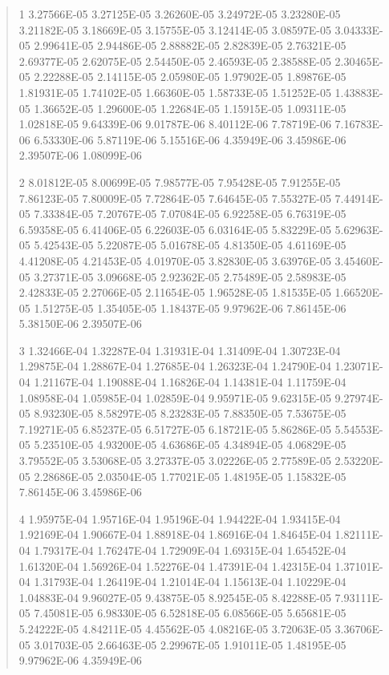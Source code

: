 \documentclass[letterpaper,10pt,english]{sphinxmanual}
\begin{document}
\begin{quote}
\begin{DUlineblock}{0em}
\item[]
\begin{DUlineblock}{\DUlineblockindent}
\item[] 1   3.27566E-05  3.27125E-05  3.26260E-05  3.24972E-05  3.23280E-05  3.21182E-05  3.18669E-05  3.15755E-05  3.12414E-05  3.08597E-05  3.04333E-05  2.99641E-05  2.94486E-05  2.88882E-05  2.82839E-05  2.76321E-05  2.69377E-05  2.62075E-05  2.54450E-05  2.46593E-05  2.38588E-05  2.30465E-05  2.22288E-05  2.14115E-05  2.05980E-05  1.97902E-05  1.89876E-05  1.81931E-05  1.74102E-05  1.66360E-05  1.58733E-05  1.51252E-05  1.43883E-05  1.36652E-05  1.29600E-05  1.22684E-05  1.15915E-05  1.09311E-05  1.02818E-05  9.64339E-06  9.01787E-06  8.40112E-06  7.78719E-06  7.16783E-06  6.53330E-06  5.87119E-06  5.15516E-06  4.35949E-06  3.45986E-06  2.39507E-06  1.08099E-06
\item[] 2   8.01812E-05  8.00699E-05  7.98577E-05  7.95428E-05  7.91255E-05  7.86123E-05  7.80009E-05  7.72864E-05  7.64645E-05  7.55327E-05  7.44914E-05  7.33384E-05  7.20767E-05  7.07084E-05  6.92258E-05  6.76319E-05  6.59358E-05  6.41406E-05  6.22603E-05  6.03164E-05  5.83229E-05  5.62963E-05  5.42543E-05  5.22087E-05  5.01678E-05  4.81350E-05  4.61169E-05  4.41208E-05  4.21453E-05  4.01970E-05  3.82830E-05  3.63976E-05  3.45460E-05  3.27371E-05  3.09668E-05  2.92362E-05  2.75489E-05  2.58983E-05  2.42833E-05  2.27066E-05  2.11654E-05  1.96528E-05  1.81535E-05  1.66520E-05  1.51275E-05  1.35405E-05  1.18437E-05  9.97962E-06  7.86145E-06  5.38150E-06  2.39507E-06
\item[] 3   1.32466E-04  1.32287E-04  1.31931E-04  1.31409E-04  1.30723E-04  1.29875E-04  1.28867E-04  1.27685E-04  1.26323E-04  1.24790E-04  1.23071E-04  1.21167E-04  1.19088E-04  1.16826E-04  1.14381E-04  1.11759E-04  1.08958E-04  1.05985E-04  1.02859E-04  9.95971E-05  9.62315E-05  9.27974E-05  8.93230E-05  8.58297E-05  8.23283E-05  7.88350E-05  7.53675E-05  7.19271E-05  6.85237E-05  6.51727E-05  6.18721E-05  5.86286E-05  5.54553E-05  5.23510E-05  4.93200E-05  4.63686E-05  4.34894E-05  4.06829E-05  3.79552E-05  3.53068E-05  3.27337E-05  3.02226E-05  2.77589E-05  2.53220E-05  2.28686E-05  2.03504E-05  1.77021E-05  1.48195E-05  1.15832E-05  7.86145E-06  3.45986E-06
\item[] 4   1.95975E-04  1.95716E-04  1.95196E-04  1.94422E-04  1.93415E-04  1.92169E-04  1.90667E-04  1.88918E-04  1.86916E-04  1.84645E-04  1.82111E-04  1.79317E-04  1.76247E-04  1.72909E-04  1.69315E-04  1.65452E-04  1.61320E-04  1.56926E-04  1.52276E-04  1.47391E-04  1.42315E-04  1.37101E-04  1.31793E-04  1.26419E-04  1.21014E-04  1.15613E-04  1.10229E-04  1.04883E-04  9.96027E-05  9.43875E-05  8.92545E-05  8.42288E-05  7.93111E-05  7.45081E-05  6.98330E-05  6.52818E-05  6.08566E-05  5.65681E-05  5.24222E-05  4.84211E-05  4.45562E-05  4.08216E-05  3.72063E-05  3.36706E-05  3.01703E-05  2.66463E-05  2.29967E-05  1.91011E-05  1.48195E-05  9.97962E-06  4.35949E-06

\end{DUlineblock}
\end{DUlineblock}
\end{quote}
\end{document}
